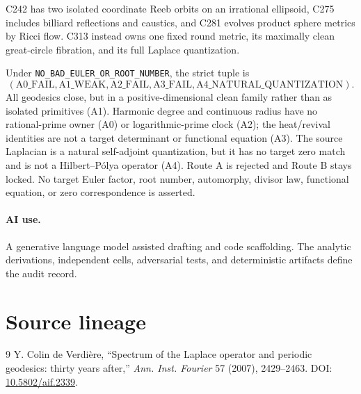 \documentclass[10pt]{article}
\begin{document}
C242 has two isolated coordinate Reeb orbits on an irrational ellipsoid,
C275 includes billiard reflections and caustics, and C281 evolves product
sphere metrics by Ricci flow.  C313 instead owns one fixed round metric, its
maximally clean great-circle fibration, and its full Laplace quantization.

Under \texttt{NO\_BAD\_EULER\_OR\_ROOT\_NUMBER}, the strict tuple is
\[
(\mathrm{A0\_FAIL},\mathrm{A1\_WEAK},\mathrm{A2\_FAIL},
 \mathrm{A3\_FAIL},\mathrm{A4\_NATURAL\_QUANTIZATION}).
\]
All geodesics close, but in a positive-dimensional clean family rather than
as isolated primitives (A1).  Harmonic degree and continuous radius have no
rational-prime owner (A0) or logarithmic-prime clock (A2); the heat/revival
identities are not a target determinant or functional equation (A3).  The
source Laplacian is a natural self-adjoint quantization, but it has no target
zero match and is not a Hilbert--P\'olya operator (A4).  Route A is rejected
and Route B stays locked.  No target Euler factor, root number, automorphy,
divisor law, functional equation, or zero correspondence is asserted.

\paragraph{AI use.} A generative language model assisted drafting and code
scaffolding.  The analytic derivations, independent cells, adversarial tests,
and deterministic artifacts define the audit record.
\fi

\section*{Source lineage}
\begin{thebibliography}{9}
 Y. Colin de Verdi\`ere,
``Spectrum of the Laplace operator and periodic geodesics: thirty years
after,'' \emph{Ann. Inst. Fourier} 57 (2007), 2429--2463.
DOI: \href{https://doi.org/10.5802/aif.2339}{10.5802/aif.2339}.
\end{thebibliography}
\end{document}
